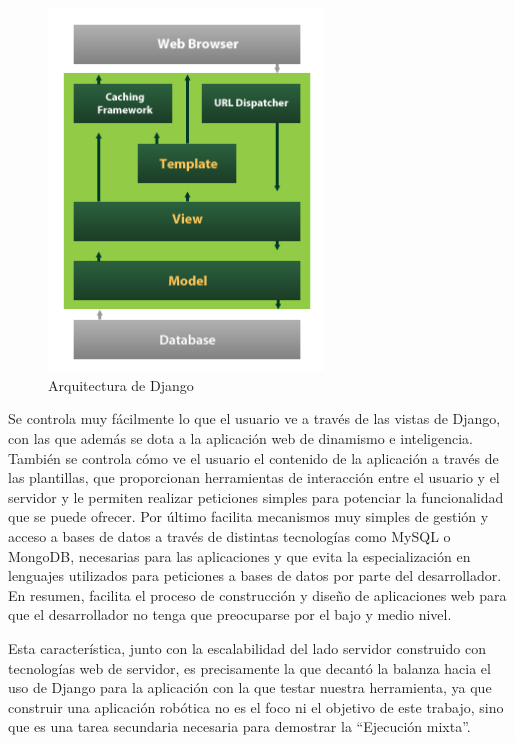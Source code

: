 \begin{figure}[!hbtp]  \centering\noindent
    \includegraphics[width=0.65\textwidth]{figures/django-arch.png}
    \caption{Arquitectura de Django}
    \label{django}
\end{figure}

Se controla muy fácilmente lo que el usuario ve a través de las vistas de Django, con las que además se dota a la aplicación web de dinamismo e inteligencia. También se controla cómo ve el usuario el contenido de la aplicación a través de las plantillas, que proporcionan herramientas de interacción entre el usuario y el servidor y le permiten realizar peticiones simples para potenciar la funcionalidad que se puede ofrecer. Por último facilita mecanismos muy simples de gestión y acceso a bases de datos a través de distintas tecnologías como MySQL o MongoDB, necesarias para las aplicaciones y que evita la especialización en lenguajes utilizados para peticiones a bases de datos por parte del desarrollador. En resumen, facilita el proceso de construcción y diseño de aplicaciones web para que el desarrollador no tenga que preocuparse por el bajo y medio nivel.

Esta característica, junto con la escalabilidad del lado servidor construido con tecnologías web de servidor, es precisamente la que decantó la balanza hacia el uso de Django para la aplicación con la que testar nuestra herramienta, ya que construir una aplicación robótica no es el foco ni el objetivo de este trabajo, sino que es una tarea secundaria necesaria para demostrar la ``Ejecución mixta''.

